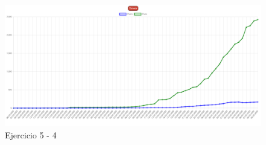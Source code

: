 \documentclass{article}
\begin{document}
\begin{itemize}
\begin{itemize}
\begin{figure}[H]
				\centering
				\includegraphics[width=1\textwidth,keepaspectratio]{img/Ejecucion5-4.png}
				\caption{Ejercicio 5 - 4}
			\end{figure}
		\end{itemize}
	\end{itemize}
\end{document}
